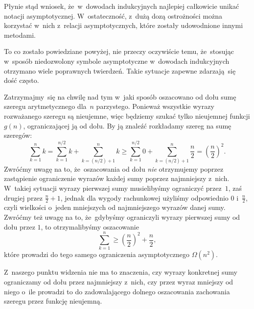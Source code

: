\documentclass[a4paper,11pt]{article}
\begin{document}
Płynie stąd wniosek, że~w~dowodach indukcyjnych najlepiej całkowicie unikać
notacji asymptotycznej. W~ostateczność, z~dużą dozą ostrożności można
korzystać w~nich z~relacji asymptotycznych, które zostały udowodnione innymi
metodami.

To co zostało powiedziane powyżej, nie przeczy oczywiście temu, że~stosując
w~sposób niedozwolony symbole asymptotyczne w~dowodach indukcyjnych otrzymano
wiele poprawnych twierdzeń. Takie sytuacje zapewne zdarzają~się dość
często.

\vspace{\spaceFour}





\noindent
{} Zatrzymajmy~się na chwilę nad tym w~jaki sposób oszacowano od dołu
sumę szeregu arytmetycznego dla~$n$ parzystego. Ponieważ wszystkie wyrazy
rozważanego szeregu są nieujemne, więc będziemy szukać tylko nieujemnej
funkcji $g( n )$, ograniczającej ją od dołu. By ją znaleźć rozkładamy szereg
na sumę szeregów:
\begin{equation}
  \label{eq:CormenAtAl-WprowadzenieDoAlgorytmow-21}
  \sum_{ k = 1 }^{ n } k =
  \sum_{ k = 1 }^{ n / 2 } k + \sum_{ k = ( n / 2 ) + 1 }^{ n } k \geq
  \sum_{ k = 1 }^{ n / 2 } 0 + \sum_{ k = ( n / 2 ) + 1 }^{ n } \frac{ n }{ 2 } =
  \left( \frac{ n }{ 2 } \right)^{ 2 }.
\end{equation}
Zwróćmy uwagę na to, że~oszacowania od dołu \textit{nie} otrzymujemy poprzez
zastąpienie ograniczenie wyrazów każdej sumy poprzez najmniejszy z~nich.
W~takiej sytuacji wyrazy pierwszej sumy musielibyśmy ograniczyć przez~$1$,
zaś drugiej przez $\frac{ n }{ 2 } + 1$, jednak dla wygody rachunkowej
użyliśmy odpowiednio $0$ i~$\frac{ n }{ 2 }$, czyli wielkości o~jeden
mniejszych od najmniejszego wyrazów danej sumy. Zwróćmy też uwagę na to,
że~gdybyśmy ograniczyli wyrazy pierwszej sumy od dołu przez $1$, to
otrzymalibyśmy oszacowanie
\begin{equation}
  \label{eq:CormenAtAl-WprowadzenieDoAlgorytmow-22}
  \sum_{ k = 1 }^{ n } \geq
  \left( \frac{ n }{ 2 } \right)^{ 2 } + \frac{ n }{ 2 },
\end{equation}
które prowadzi do tego samego ograniczenia asymptotycznego $\Omega( n^{ 2 } )$.

Z~naszego punktu widzenia nie ma to znaczenia, czy wyrazy konkretnej sumy
ograniczamy od dołu przez najmniejszy z~nich, czy przez wyraz mniejszy od
niego o~ile prowadzi to do zadowalającego dolnego oszacowania zachowania szeregu przez funkcję nieujemną.
\end{document}
